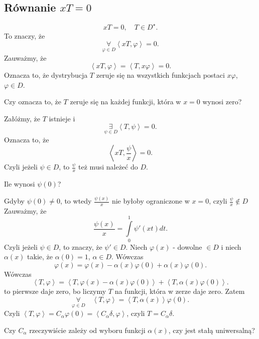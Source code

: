 \documentclass[../main.tex]{subfiles}
\begin{document}
\subsection{Równanie $xT = 0$}
 \[
    x T = 0,\quad T\in D^\star
.\]
To znaczy, że
\[
    \underset{\varphi\in D}{\forall} \left<xT, \varphi \right> = 0
.\]
Zauważmy, że
\[
    \left<xT, \varphi \right> = \left<T, x\varphi \right> = 0
.\]
Oznacza to, że dystrybucja $T$ zeruje się na wszystkich funkcjach postaci $x\varphi$, $\varphi\in D$.
\begin{pytanie}
    Czy oznacza to, że $T$ zeruje się na każdej funkcji, która w $x = 0$ wynosi zero?
\end{pytanie}
Załóżmy, że $T$ istnieje i
\[
    \underset{\psi\in D}{\exists} \left<T,\psi \right> = 0
.\]
Oznacza to, że
\[
    \left< xT, \frac{\psi}{x} \right> = 0
.\]
Czyli jeżeli $\psi\in D$, to $\frac{\psi}{x}$ też musi należeć do $D$.
\begin{pytanie}
    Ile wynosi $\psi(0)$?
\end{pytanie}
Gdyby $\psi(0) \neq 0$, to wtedy $\frac{\psi(x)}{x}$ nie byłoby ograniczone w $x = 0$, czyli  $\frac{\psi}{x}\not\in D$
Zauważmy, że
\[
    \frac{\psi(x)}{x} = \int\limits_{0}^{1} \psi'(xt)dt
.\]
Czyli jeżeli $\psi\in D$, to znaczy, że $\psi'\in D$.
Niech  $\varphi(x)$ - dowolne $\in D$ i niech $\alpha(x)$ takie, że $\alpha(0) = 1$, $\alpha\in D$. Wówczas
\[
    \varphi(x) = \varphi(x) - \alpha(x)\varphi(0) + \alpha(x)\varphi(0)
.\]
Wówczas
\[
    \left<T, \varphi \right> = \left<T, \varphi(x) - \alpha(x)\varphi(0) \right> + \left<T, \alpha(x)\varphi(0) \right>
.\]
to pierwsze daje zero, bo liczymy $T$ na funkcji, która  w zerze daje zero.
Zatem
\[
    \underset{\varphi\in D}{\forall}\quad \left<T,\varphi \right> = \left<T, \alpha(x) \right>\varphi(0)
.\]
Czyli $\left<T,\varphi \right> = C_\alpha \varphi(0) = \left<C_\alpha \delta, \varphi \right>$, czyli $T = C_\alpha \delta$.
\begin{pytanie}
    Czy $C_\alpha$ rzeczywiście zależy od wyboru funkcji $\alpha(x)$, czy jest stałą uniwersalną?
\end{pytanie}
\end{document}
